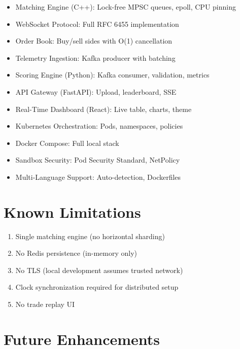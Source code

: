 \documentclass[10pt,a4paper,oneside]{report}
\begin{document}
\begin{itemize}
    \item[\checkmark] Matching Engine (C++): Lock-free MPSC queues, epoll, CPU pinning
    \item[\checkmark] WebSocket Protocol: Full RFC 6455 implementation
    \item[\checkmark] Order Book: Buy/sell sides with O(1) cancellation
    \item[\checkmark] Telemetry Ingestion: Kafka producer with batching
    \item[\checkmark] Scoring Engine (Python): Kafka consumer, validation, metrics
    \item[\checkmark] API Gateway (FastAPI): Upload, leaderboard, SSE
    \item[\checkmark] Real-Time Dashboard (React): Live table, charts, theme
    \item[\checkmark] Kubernetes Orchestration: Pods, namespaces, policies
    \item[\checkmark] Docker Compose: Full local stack
    \item[\checkmark] Sandbox Security: Pod Security Standard, NetPolicy
    \item[\checkmark] Multi-Language Support: Auto-detection, Dockerfiles
\end{itemize}

\section{Known Limitations}

\begin{enumerate}
    \item Single matching engine (no horizontal sharding)
    \item No Redis persistence (in-memory only)
    \item No TLS (local development assumes trusted network)
    \item Clock synchronization required for distributed setup
    \item No trade replay UI
\end{enumerate}

\section{Future Enhancements}
\end{document}
